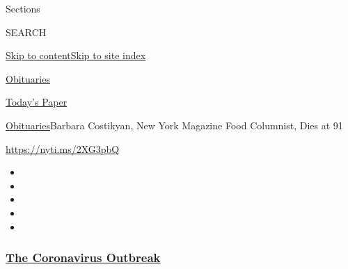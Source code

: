 Sections

SEARCH

\protect\hyperlink{site-content}{Skip to
content}\protect\hyperlink{site-index}{Skip to site index}

\href{https://www.nytimes3xbfgragh.onion/section/obituaries}{Obituaries}

\href{https://myaccount.nytimes3xbfgragh.onion/auth/login?response_type=cookie\&client_id=vi}{}

\href{https://www.nytimes3xbfgragh.onion/section/todayspaper}{Today's
Paper}

\href{/section/obituaries}{Obituaries}\textbar{}Barbara Costikyan, New
York Magazine Food Columnist, Dies at 91

\url{https://nyti.ms/2XG3pbQ}

\begin{itemize}
\item
\item
\item
\item
\item
\end{itemize}

\hypertarget{the-coronavirus-outbreak}{%
\subsubsection{\texorpdfstring{\href{https://www.nytimes3xbfgragh.onion/news-event/coronavirus?name=promo-coronavirus-obits\&region=TOP_BANNER\&block=storyline_menu_recirc\&action=click\&pgtype=Article\&impression_id=f99f2410-f2da-11ea-b8cd-7399ba641282\&variant=undefined}{The
Coronavirus
Outbreak}}{The Coronavirus Outbreak}}\label{the-coronavirus-outbreak}}

